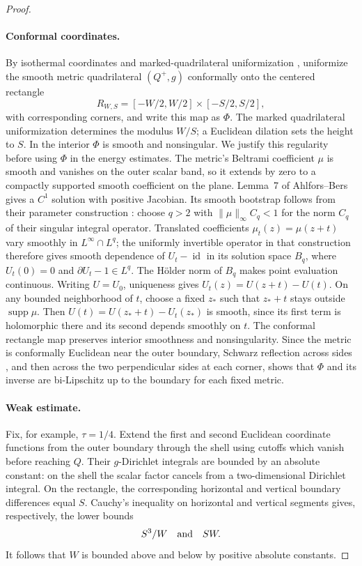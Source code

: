 \documentclass[11pt]{article}
\numberwithin{equation}{section}
\theoremstyle{definition}
\theoremstyle{remark}
\begin{document}
\begin{proof}
\paragraph{Conformal coordinates.}
By isothermal coordinates and marked-quadrilateral uniformization
\cite[Lemma~7 and Theorem~6]{AhlforsBers1960}\cite[Theorem~4.31]{McMullen2023},
uniformize the smooth metric quadrilateral $(Q^+,g)$ conformally onto
the centered rectangle
\[
 R_{W,S}=[-W/2,W/2]\times[-S/2,S/2],
\]
with corresponding corners, and write this map as $\Phi$.  The marked
quadrilateral uniformization determines the modulus $W/S$; a Euclidean
dilation sets the height to $S$.  In the interior $\Phi$ is smooth and
nonsingular. We justify this regularity before using $\Phi$ in the
energy estimates.
The metric's
Beltrami coefficient $\mu$ is smooth and vanishes on the outer scalar
band, so it extends by zero to a compactly supported smooth coefficient
on the plane. Lemma~7 of Ahlfors--Bers gives a $C^1$ solution with
positive Jacobian. Its smooth bootstrap follows from their
parameter construction \cite[Section~2, Theorem~2]{AhlforsBers1960}:
choose $q>2$ with $\|\mu\|_\infty C_q<1$ for the norm $C_q$ of
their singular integral operator. Translated coefficients
$\mu_t(z)=\mu(z+t)$ vary smoothly in $L^\infty\cap L^q$; the
uniformly invertible operator in that construction therefore gives
smooth dependence of $U_t-\operatorname{id}$ in its solution space $B_q$, where
$U_t(0)=0$ and $\partial U_t-1\in L^q$. The H\"older norm of $B_q$
makes point evaluation continuous.
Writing $U=U_0$, uniqueness gives $U_t(z)=U(z+t)-U(t)$. On any bounded neighborhood
of $t$, choose a fixed $z_*$ such that $z_*+t$ stays outside
$\operatorname{supp}\mu$. Then
$U(t)=U(z_*+t)-U_t(z_*)$ is smooth, since its first term is
holomorphic there and its second depends smoothly on $t$.
The conformal rectangle map preserves interior smoothness and
nonsingularity. Since the metric is conformally Euclidean near the outer
boundary, Schwarz reflection across sides
\cite[Chapter~4, Section~6.5, Theorem~24]{Ahlfors1979}, and then across the two
perpendicular sides at each corner, shows that $\Phi$ and its inverse
are bi-Lipschitz up to the boundary for each fixed metric.

\paragraph{Weak estimate.}
Fix, for example, $\tau=1/4$. Extend the first
and second Euclidean coordinate functions from the outer boundary
through the shell using cutoffs which vanish before reaching $Q$.
Their $g$-Dirichlet integrals are bounded by an absolute constant:
on the shell the scalar factor cancels from a two-dimensional
Dirichlet integral.  On the rectangle, the corresponding horizontal
and vertical boundary differences equal $S$.  Cauchy's inequality on
horizontal and vertical segments gives, respectively, the lower bounds
\begin{equation}
 S^3/W\quad\hbox{and}\quad SW.
 \label{lt:rectangle-lower}
\end{equation}
It follows that $W$ is bounded above and below by positive absolute
constants.


\end{proof}
\end{document}
